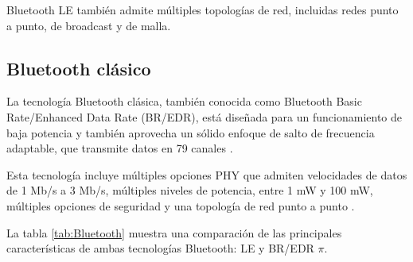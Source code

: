 Bluetooth LE también admite múltiples topologías de red, incluidas redes punto a punto, de broadcast y de malla.


\subsection{Bluetooth clásico}

La tecnología Bluetooth clásica, también conocida como Bluetooth Basic Rate/Enhanced Data Rate (BR/EDR), está diseñada para un funcionamiento de baja potencia y también aprovecha un sólido enfoque de salto de frecuencia adaptable, que transmite datos en 79 canales \cite{5}.

Esta tecnología incluye múltiples opciones PHY que admiten velocidades de datos de 1 Mb/s a 3 Mb/s, múltiples niveles de potencia, entre 1 mW y 100 mW, múltiples opciones de seguridad y una topología de red punto a punto \cite{5}.

La tabla \ref{tab:Bluetooth} muestra una comparación de las principales características de ambas tecnologías Bluetooth: LE y BR/EDR $\pi$.

